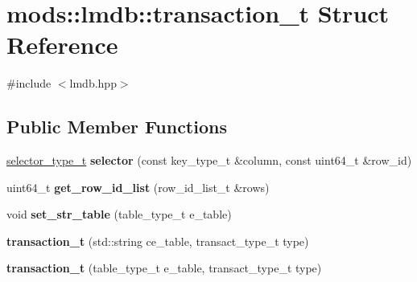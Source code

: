 \hypertarget{structmods_1_1lmdb_1_1transaction__t}{}\section{mods\+:\+:lmdb\+:\+:transaction\+\_\+t Struct Reference}
\label{structmods_1_1lmdb_1_1transaction__t}


{\ttfamily \#include $<$lmdb.\+hpp$>$}

\subsection*{Public Member Functions}
\begin{DoxyCompactItemize}
\item 
\mbox{\label{structmods_1_1lmdb_1_1transaction__t_a3ad01fb11426f89327765dc0055d94a3}} 
\hyperlink{structmods_1_1lmdb_1_1__selector}{selector\+\_\+type\+\_\+t} {\bfseries selector} (const key\+\_\+type\+\_\+t \&column, const uint64\+\_\+t \&row\+\_\+id)
\item 
\mbox{\label{structmods_1_1lmdb_1_1transaction__t_af4013121c80d588b0916a98662e4295f}} 
uint64\+\_\+t {\bfseries get\+\_\+row\+\_\+id\+\_\+list} (row\+\_\+id\+\_\+list\+\_\+t \&rows)
\item 
\mbox{\label{structmods_1_1lmdb_1_1transaction__t_aa130620f69dc71f180e6ef9771373d0d}} 
void {\bfseries set\+\_\+str\+\_\+table} (table\+\_\+type\+\_\+t e\+\_\+table)
\item 
\mbox{\label{structmods_1_1lmdb_1_1transaction__t_a37e8dc8e3f9e3f705bdb801d829210ff}} 
{\bfseries transaction\+\_\+t} (std\+::string ce\+\_\+table, transact\+\_\+type\+\_\+t type)
\item 
\mbox{\label{structmods_1_1lmdb_1_1transaction__t_a516bc4084eb3ed2b282e7d059b2ef409}} 
{\bfseries transaction\+\_\+t} (table\+\_\+type\+\_\+t e\+\_\+table, transact\+\_\+type\+\_\+t type)
\item 
\mbox{\label{structmods_1_1lmdb_1_1transaction__t_aad6618e385ed22538f860f0d1f2ae3ac}} 

\end{DoxyCompactItemize}
